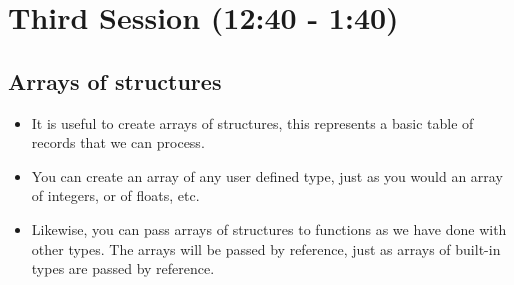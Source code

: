\documentclass[11pt]{article}
\begin{document}
\section{Third Session (12:40 - 1:40)}
\label{sec-3}
\subsection{Arrays of structures}
\label{sec-3-1}

\begin{itemize}
\item It is useful to create arrays of structures, this represents a basic
  table of records that we can process.
\item You can create an array of any user defined type, just as you would an
  array of integers, or of floats, etc.
\item Likewise, you can pass arrays of structures to functions as we have done
  with other types.  The arrays will be passed by reference, just as
  arrays of built-in types are passed by reference.
\end{itemize}
\end{document}
